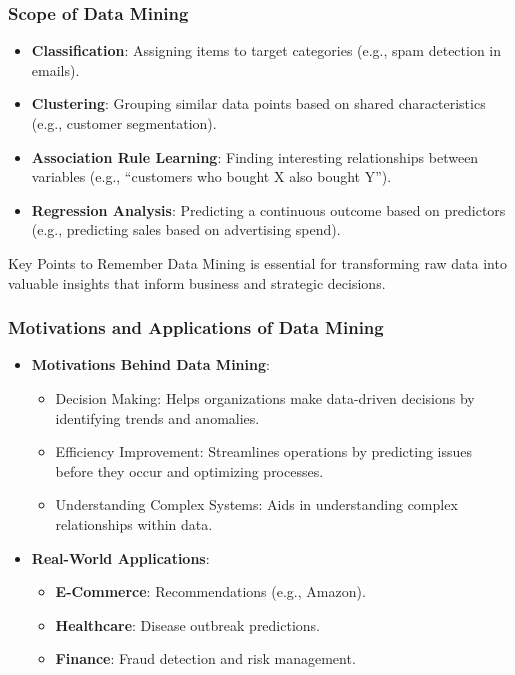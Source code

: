 \documentclass[aspectratio=169]{beamer}
\begin{document}
\begin{frame}[fragile]
    \frametitle{Scope of Data Mining}
    \begin{itemize}
        \item \textbf{Classification}: Assigning items to target categories (e.g., spam detection in emails).
        \item \textbf{Clustering}: Grouping similar data points based on shared characteristics (e.g., customer segmentation).
        \item \textbf{Association Rule Learning}: Finding interesting relationships between variables (e.g., “customers who bought X also bought Y”).
        \item \textbf{Regression Analysis}: Predicting a continuous outcome based on predictors (e.g., predicting sales based on advertising spend).
    \end{itemize}
    \begin{block}{Key Points to Remember}
        Data Mining is essential for transforming raw data into valuable insights that inform business and strategic decisions.
    \end{block}
\end{frame}

\begin{frame}[fragile]
    \frametitle{Motivations and Applications of Data Mining}
    \begin{itemize}
        \item \textbf{Motivations Behind Data Mining}:
            \begin{itemize}
                \item Decision Making: Helps organizations make data-driven decisions by identifying trends and anomalies.
                \item Efficiency Improvement: Streamlines operations by predicting issues before they occur and optimizing processes.
                \item Understanding Complex Systems: Aids in understanding complex relationships within data.
            \end{itemize}
        \vspace{1em}
        \item \textbf{Real-World Applications}:
            \begin{itemize}
                \item \textbf{E-Commerce}: Recommendations (e.g., Amazon).
                \item \textbf{Healthcare}: Disease outbreak predictions.
                \item \textbf{Finance}: Fraud detection and risk management.
            \end{itemize}
    \end{itemize}
\end{frame}
\end{document}
